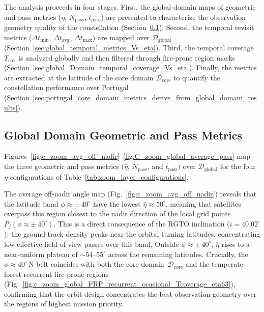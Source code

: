 The analysis proceeds in four stages.  First, the global-domain maps of geometric and pass metrics ($\eta$, $N_{\text{pass}}$, $\bar{t}_{\text{pass}}$) are presented to characterize the observation geometry quality of the constellation (Section~\ref{sec:global_geometric_pass_metrics}).  Second, the temporal revisit metrics ($\Delta t_{\min}$, $\Delta t_{\text{avg}}$, $\Delta t_{\max}$) are mapped over $\mathcal{D}_{\text{global}}$ (Section~\ref{sec:global_temporal_metrics_Vs_eta}).  Third, the temporal coverage $T_{\text{cov}}$ is analyzed globally and then filtered through fire-prone region masks (Section~\ref{sec:global_Domain_temporal_coverage_Vs_eta}).  Finally, the metrics are extracted at the latitude of the core domain $\mathcal{D}_{\text{core}}$ to quantify the constellation performance over Portugal (Section~\ref{sec:portugal_core_domain_metrics_derive_from_global_domain_results}).


\subsection{Global Domain Geometric and Pass Metrics}
\label{sec:global_geometric_pass_metrics}

Figures~\ref{fig:c_zoom_avg_off_nadir}--\ref{fig:C_zoom_global_average_pass} map the three geometric and pass metrics $(\bar{\eta}$, $N_{\text{pass}}$, and $\bar{t}_{\text{pass}})$ over $\mathcal{D}_{\text{global}}$ for the four $\eta$ configurations of Table~\ref{tab:zoom_layer_configurations}.

The average off-nadir angle map (Fig.~\ref{fig:c_zoom_avg_off_nadir}) reveals that the latitude band $\phi \approx \pm\,40^{\circ}$ have the lowest $\bar{\eta} \approx 50^{\circ}$, meaning that satellites overpass this region closest to the nadir direction of the local grid points~$P_j(\phi \approx \pm\,40^{\circ})$.  This is a direct consequence of the RGTO inclination ($i = 40.02^{\circ}$): the ground-track density peaks near the orbital turning latitudes, concentrating low effective field of view passes over this band.  Outside $\phi \approx \pm\,40^{\circ}$, $\bar{\eta}$ rises to a near-uniform plateau of $\sim\!54$--$55^{\circ}$ across the remaining latitudes.  Crucially, the $\phi \approx 40^{\circ}$\,N belt coincides with both the core domain~$\mathcal{D}_{\text{core}}$ and the temperate-forest recurrent fire-prone regions (Fig.~\ref{fig:c_zoom_global_FRP_recurrent_ocasional_Tcoverage_eta63}), confirming that the orbit design concentrates the best observation geometry over the regions of highest mission priority.

